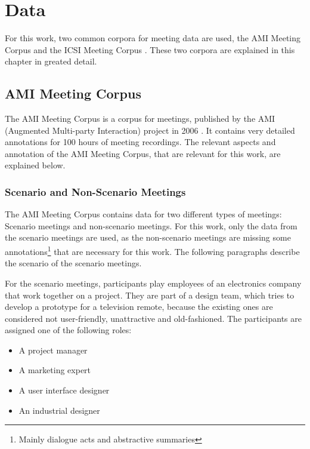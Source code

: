\chapter{Data}\label{ch:data}

For this work, two common corpora for meeting data are used, the AMI Meeting Corpus \cite{Mccowan05theami} and the ICSI Meeting Corpus \cite{Janin}.
These two corpora are explained in this chapter in greated detail.


\section{AMI Meeting Corpus}\label{sec:ami-meeting-corpus}

The AMI Meeting Corpus is a corpus for meetings, published by the AMI (Augmented Multi-party Interaction) project in 2006 \cite{Mccowan05theami}.
It contains very detailed annotations for 100 hours of meeting recordings.
The relevant aspects and annotation of the AMI Meeting Corpus, that are relevant for this work, are explained below.

\subsection{Scenario and Non-Scenario Meetings}

The AMI Meeting Corpus contains data for two different types of meetings: Scenario meetings and non-scenario meetings.
For this work, only the data from the scenario meetings are used, as the non-scenario meetings are missing some annotations\footnote{Mainly dialogue acts and abstractive summaries} that are necessary for this work.
The following paragraphs describe the scenario of the scenario meetings.

For the scenario meetings, participants play employees of an electronics company that work together on a project.
They are part of a design team, which tries to develop a prototype for a television remote, because the existing ones are considered not user-friendly, unattractive and old-fashioned.
The participants are assigned one of the following roles:
\begin{itemize}
\item A project manager
\item A marketing expert
\item A user interface designer
\item An industrial designer
\end{itemize}

